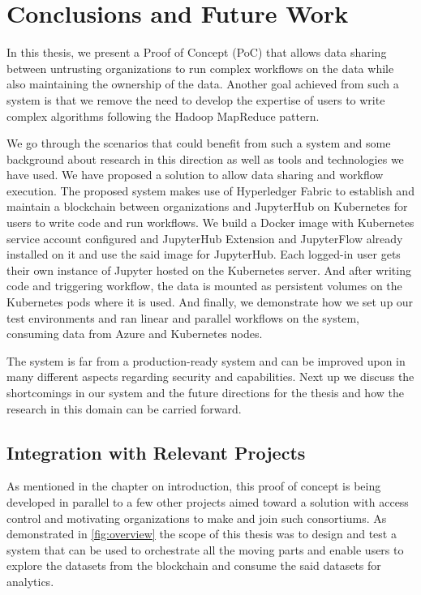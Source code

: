 
\chapter{Conclusions and Future Work}
\label{ch:conclusion}
In this thesis, we present a Proof of Concept (PoC) that allows data sharing between untrusting organizations to run complex workflows on the data while also maintaining the ownership of the data. Another goal achieved from such a system is that we remove the need to develop the expertise of users to write complex algorithms following the Hadoop MapReduce pattern.

\bigskip
We go through the scenarios that could benefit from such a system and some background about research in this direction as well as tools and technologies we have used. We have proposed a solution to allow data sharing and workflow execution. The proposed system makes use of Hyperledger Fabric to establish and maintain a blockchain between organizations and JupyterHub on Kubernetes for users to write code and run workflows. We build a Docker image with Kubernetes service account configured and JupyterHub Extension and JupyterFlow already installed on it and use the said image for JupyterHub. Each logged-in user gets their own instance of Jupyter hosted on the Kubernetes server. And after writing code and triggering workflow, the data is mounted as persistent volumes on the Kubernetes pods where it is used. And finally, we demonstrate how we set up our test environments and ran linear and parallel workflows on the system, consuming data from Azure and Kubernetes nodes.

\bigskip
The system is far from a production-ready system and can be improved upon in many different aspects regarding security and capabilities. Next up we discuss the shortcomings in our system and the future directions for the thesis and how the research in this domain can be carried forward.

\section{Integration with Relevant Projects}
As mentioned in the chapter on introduction, this proof of concept is being developed in parallel to a few other projects aimed toward a solution with access control and motivating organizations to make and join such consortiums. As demonstrated in \ref{fig:overview} the scope of this thesis was to design and test a system that can be used to orchestrate all the moving parts and enable users to explore the datasets from the blockchain and consume the said datasets for analytics.

